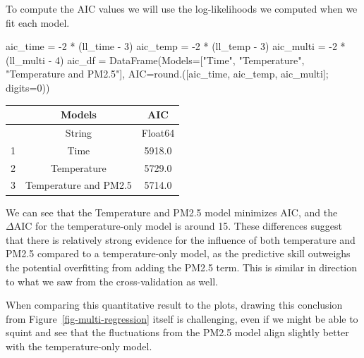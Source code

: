 \documentclass[
  letterpaper,
  DIV=11,
  numbers=noendperiod]{scrartcl}
\newenvironment{Shaded}{\begin{snugshade}}{\end{snugshade}}
\newcommand{\FloatTok}[1]{\textcolor[rgb]{0.68,0.00,0.00}{#1}}
\newcommand{\FunctionTok}[1]{\textcolor[rgb]{0.28,0.35,0.67}{#1}}
\newcommand{\NormalTok}[1]{\textcolor[rgb]{0.00,0.23,0.31}{#1}}
\newcommand{\OperatorTok}[1]{\textcolor[rgb]{0.37,0.37,0.37}{#1}}
\newcommand{\StringTok}[1]{\textcolor[rgb]{0.13,0.47,0.30}{#1}}
\begin{document}
To compute the AIC values we will use the log-likelihoods we computed
when we fit each model.

\begin{Shaded}
\begin{Highlighting}[]
\NormalTok{aic\_time }\OperatorTok{=} \OperatorTok{{-}}\FloatTok{2} \OperatorTok{*}\NormalTok{ (ll\_time }\OperatorTok{{-}} \FloatTok{3}\NormalTok{)}
\NormalTok{aic\_temp }\OperatorTok{=} \OperatorTok{{-}}\FloatTok{2} \OperatorTok{*}\NormalTok{ (ll\_temp }\OperatorTok{{-}} \FloatTok{3}\NormalTok{)}
\NormalTok{aic\_multi }\OperatorTok{=} \OperatorTok{{-}}\FloatTok{2} \OperatorTok{*}\NormalTok{ (ll\_multi }\OperatorTok{{-}} \FloatTok{4}\NormalTok{)}
\NormalTok{aic\_df }\OperatorTok{=} \FunctionTok{DataFrame}\NormalTok{(Models}\OperatorTok{=}\NormalTok{[}\StringTok{"Time"}\NormalTok{, }\StringTok{"Temperature"}\NormalTok{, }\StringTok{"Temperature and PM2.5"}\NormalTok{], AIC}\OperatorTok{=}\FunctionTok{round}\NormalTok{.([aic\_time, aic\_temp, aic\_multi]; digits}\OperatorTok{=}\FloatTok{0}\NormalTok{))}
\end{Highlighting}
\end{Shaded}

\begin{tabular}{r|cc}
    & Models & AIC\\
    \hline
    & String & Float64\\
    \hline
    1 & Time & 5918.0 \\
    2 & Temperature & 5729.0 \\
    3 & Temperature and PM2.5 & 5714.0 \\
\end{tabular}

We can see that the Temperature and PM2.5 model minimizes AIC, and the
\(\Delta \text{AIC}\) for the temperature-only model is around 15. These
differences suggest that there is relatively strong evidence for the
influence of both temperature and PM2.5 compared to a temperature-only
model, as the predictive skill outweighs the potential overfitting from
adding the PM2.5 term. This is similar in direction to what we saw from
the cross-validation as well.

When comparing this quantitative result to the plots, drawing this
conclusion from Figure~\ref{fig-multi-regression} itself is challenging,
even if we might be able to squint and see that the fluctuations from
the PM2.5 model align slightly better with the temperature-only model.
\end{document}
